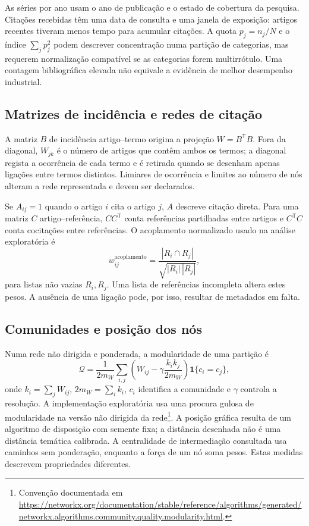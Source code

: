 As séries por ano usam o ano de publicação e o estado de cobertura da pesquisa. Citações recebidas têm uma data de consulta e uma janela de exposição: artigos recentes tiveram menos tempo para acumular citações. A quota $p_j=n_j/N$ e o índice $\sum_jp_j^2$ podem descrever concentração numa partição de categorias, mas requerem normalização compatível se as categorias forem multirrótulo. Uma contagem bibliográfica elevada não equivale a evidência de melhor desempenho industrial.

\subsection{Matrizes de incidência e redes de citação}
\label{sec:mat-redes}
A matriz $B$ de incidência artigo--termo origina a projeção $W=B^{\mathsf T}B$. Fora da diagonal, $W_{jk}$ é o número de artigos que contêm ambos os termos; a diagonal regista a ocorrência de cada termo e é retirada quando se desenham apenas ligações entre termos distintos. Limiares de ocorrência e limites ao número de nós alteram a rede representada e devem ser declarados.

Se $A_{ij}=1$ quando o artigo $i$ cita o artigo $j$, $A$ descreve citação direta. Para uma matriz $C$ artigo--referência, $CC^{\mathsf T}$ conta referências partilhadas entre artigos e $C^{\mathsf T}C$ conta cocitações entre referências. O acoplamento normalizado usado na análise exploratória é
\begin{equation}
w_{ij}^{\mathrm{acoplamento}}=
\frac{|R_i\cap R_j|}{\sqrt{|R_i|\,|R_j|}},
\label{eq:mat-acoplamento}
\end{equation}
para listas não vazias $R_i,R_j$. Uma lista de referências incompleta altera estes pesos. A ausência de uma ligação pode, por isso, resultar de metadados em falta.

\subsection{Comunidades e posição dos nós}
\label{sec:mat-modularidade}
Numa rede não dirigida e ponderada, a modularidade de uma partição é
\begin{equation}
\mathcal Q=\frac1{2m_W}\sum_{i,j}
\left(W_{ij}-\gamma\frac{k_i k_j}{2m_W}\right)\mathbf1\{c_i=c_j\},
\label{eq:mat-modularidade}
\end{equation}
onde $k_i=\sum_jW_{ij}$, $2m_W=\sum_ik_i$, $c_i$ identifica a comunidade e $\gamma$ controla a resolução. A implementação exploratória usa uma procura gulosa de modularidade na versão não dirigida da rede\footnote{Convenção documentada em \url{https://networkx.org/documentation/stable/reference/algorithms/generated/networkx.algorithms.community.quality.modularity.html}.}. A posição gráfica resulta de um algoritmo de disposição com semente fixa; a distância desenhada não é uma distância temática calibrada. A centralidade de intermediação consultada usa caminhos sem ponderação, enquanto a força de um nó soma pesos. Estas medidas descrevem propriedades diferentes.

